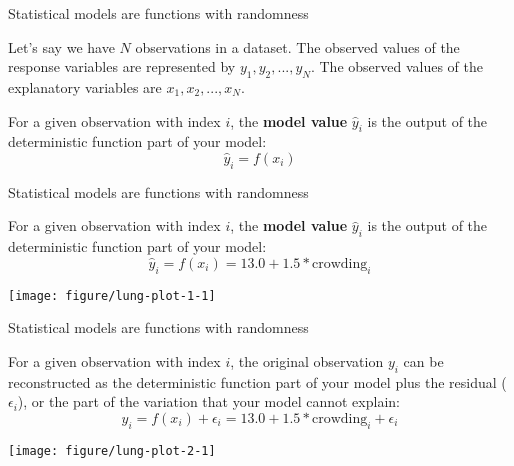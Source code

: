 \documentclass[table]{beamer}\usepackage[]{graphicx}\usepackage[]{color}
\makeatletter
\def\maxwidth{ %
  \ifdim\Gin@nat@width>\linewidth
    \linewidth
  \else
    \Gin@nat@width
  \fi
}
\newenvironment{knitrout}{}{} %
\makeatother
\begin{document}

\begin{frame}[fragile]{Statistical models are functions with randomness}

\bi
\myitem Let's say we have $N$ observations in a dataset. The observed values of the response variables are represented by $y_1, y_2, ..., y_N$.
\myitem The observed values of the explanatory variables are $x_1, x_2, ..., x_N$.

\myitem For a given observation with index $i$, the {\bf model value} $\hat y_i$ is the output of the deterministic function part of your model:
$$ \hat y_i = f(x_i) $$

\ei


\end{frame}



\begin{frame}[fragile]{Statistical models are functions with randomness}

For a given observation with index $i$, the {\bf model value} $\hat y_i$ is the output of the deterministic function part of your model:
$$ \hat y_i = f(x_i) = 13.0 + 1.5*\mbox{crowding}_i $$

\begin{knitrout}\footnotesize
{}\color{fgcolor}
\texttt{[image: figure/lung-plot-1-1]} 
\end{knitrout}



\end{frame}




\begin{frame}[fragile]{Statistical models are functions with randomness}


For a given observation with index $i$, the original observation $y_i$ can be reconstructed as  the deterministic function part of your model plus the residual ($\epsilon_i$), or the part of the variation that your model cannot explain:
$$ y_i = f(x_i) + \epsilon_i = 13.0 + 1.5*\mbox{crowding}_i + \epsilon_i$$

\begin{knitrout}\footnotesize
{}\color{fgcolor}
\texttt{[image: figure/lung-plot-2-1]} 
\end{knitrout}

\end{frame}
\end{document}
